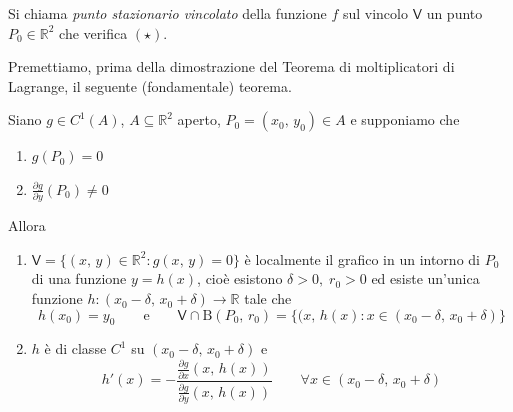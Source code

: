 \begin{definition}
Si chiama \emph{punto stazionario vincolato} della funzione $f$ sul vincolo $\mathsf{V}$ un punto $P_0 \in\mathbb{R}^2$ che verifica $\mathrm{(\star)}$.
\end{definition}

Premettiamo, prima della dimostrazione del Teorema di moltiplicatori di Lagrange, il seguente (fondamentale) teorema.

\begin{thm}
Siano $g \in C^1(A)$, $A \subseteq \mathbb{R}^2$ aperto, $P_0 = (x_0,\,y_0) \in A$ e supponiamo che
\begin{enumerate}[labelindent=\parindent,leftmargin=*,label=\textnormal{(\roman*)},start=1]
\item $g(P_0) = 0$
\item $\displaystyle \frac{\partial g}{\partial y}(P_0) \neq 0$
\end{enumerate}
Allora
\begin{enumerate}[labelindent=\parindent,leftmargin=*,label=\textnormal{(D\arabic*)},start=1]
\item $\mathsf{V} = \lbrace (x,\,y) \in \mathbb{R}^2 : g(x,\,y) = 0 \rbrace$ è localmente il grafico in un intorno di $P_0$ di una funzione $y = h(x)$, cioè esistono $\delta > 0,\; r_0 > 0$ ed esiste un'unica funzione $h : (x_0 - \delta,\, x_0 + \delta) \longrightarrow \mathbb{R}$ tale che
$$
h(x_0) = y_0
\qquad \text{e} \qquad 
\mathsf{V} \cap \mathrm{B}(P_0,\,r_0) = \lbrace (x,\,h(x) : x \in (x_0 - \delta,\, x_0 + \delta) \rbrace
$$
\item $h$ è di classe $C^1$ su $(x_0 - \delta,\, x_0 + \delta)$ e
$$
h'(x) = - \frac{\displaystyle \frac{\partial g}{\partial x} \left( x,\,h(x) \right)}{\displaystyle \frac{\partial g}{\partial y} \left( x,\,h(x) \right)}
\qquad \forall x \in (x_0 - \delta,\, x_0 + \delta)
$$
\end{enumerate}
\end{thm}

